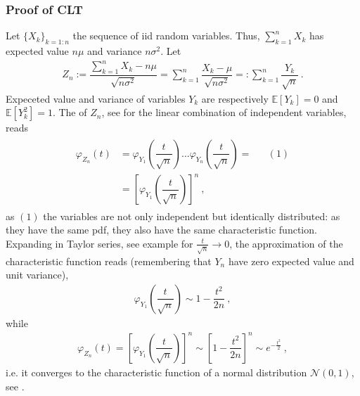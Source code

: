 \documentclass[letterpaper,10pt,english]{jupyterBook}
\begin{document}
\subsubsection*{Proof of CLT}

\sphinxAtStartPar
Let \(\{ X_k \}_{k=1:n}\) the sequence of iid random variables. Thus, \(\sum_{k=1}^n X_k\) has expected value \(n \mu\) and variance \(n \sigma^2\). Let
\begin{equation*}
\begin{split}Z_n := \dfrac{\sum_{k=1}^n X_k - n \mu}{\sqrt{n \sigma^2}} = \sum_{k=1}^{n} \dfrac{X_k - \mu}{\sqrt{n \sigma^2}} =: \sum_{k=1}^n \dfrac{Y_k}{\sqrt{n}} \ .\end{split}
\end{equation*}
\sphinxAtStartPar
Expeceted value and variance of variables \(Y_k\) are respectively \(\mathbb{E}[Y_k] = 0\) and \(\mathbb{E}[Y_k^2] = 1\).
The {\hyperref[\detokenize{ch/prob/characteristic-fun:prob-characteristic-fun}]{}} of \(Z_n\), see {\hyperref[\detokenize{ch/prob/characteristic-fun:ex:char-fun:independent}]{}} for the linear combination of independent variables, reads
\begin{equation*}
\begin{split}\begin{aligned}
  \varphi_{Z_n}(t) 
  & = \varphi_{Y_1} \left( \dfrac{t}{\sqrt{n}} \right) \dots \varphi_{Y_n} \left( \dfrac{t}{\sqrt{n}} \right) = &&  (1) \\
  & = \left[ \varphi_{Y_1} \left( \dfrac{t}{\sqrt{n}} \right) \right]^n \ ,
\end{aligned}\end{split}
\end{equation*}
\sphinxAtStartPar
as \((1)\) the variables are not only independent but identically distributed: as they have the same pdf, they also have the same characteristic function. Expanding in Taylor series, see example {\hyperref[\detokenize{ch/prob/characteristic-fun:ex:char-fun:taylor}]{}} for \(\frac{t}{\sqrt{n}} \rightarrow 0\), the approximation of the characteristic function reads (remembering that \(Y_n\) have zero expected value and unit variance),
\begin{equation*}
\begin{split}\varphi_{Y_1}\left( \dfrac{t}{\sqrt{n}} \right) \sim 1 - \dfrac{t^2}{2 n} \ ,\end{split}
\end{equation*}
\sphinxAtStartPar
while
\begin{equation*}
\begin{split}\varphi_{Z_n}(t) = \left[ \varphi_{Y_1} \left( \dfrac{t}{\sqrt{n}} \right) \right]^n \sim \left[  1 - \dfrac{t^2}{2 n}  \right]^n \sim e^{- \frac{t^2}{2}} \ ,\end{split}
\end{equation*}
\sphinxAtStartPar
i.e. it converges to the characteristic function of a normal distribution \(\mathscr{N}(0,1)\), see {\hyperref[\detokenize{ch/prob/characteristic-fun:ex:char-fun:normal}]{}}.
\end{document}
